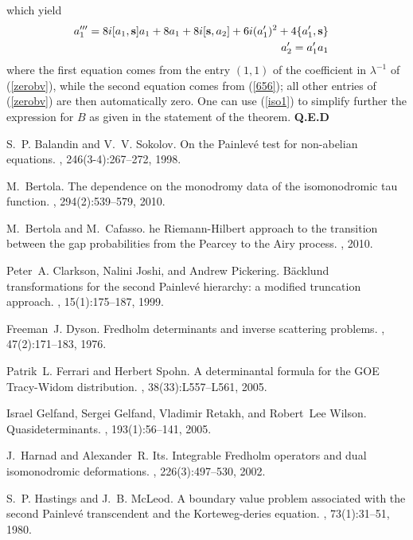 \documentclass{article}
\def\ss{\mathbf s}
\def\&{&\hspace{-20pt}}
\def\QED{ {\bf Q.E.D}\par \vskip 4pt}
\newcommand{\be}{\begin{eqnarray}}
\newcommand{\ee}{\end{eqnarray}}
\begin{document}
which yield
\be
&\& a_1''' =  8i [a_1,\ss]a_1 + 8a_1 + 8i[\ss,a_2] + 6i (a_1')^2 + 4 \{a_1',\ss\} \label{iso1} \\
&\& a_2' = a_1' a_1\label{iso2}
\ee
where the first equation comes from the entry $(1,1)$ of the coefficient in $\lambda^{-1}$ of (\ref{zerobv}), while the  second equation comes from (\ref{656}); all other entries of (\ref{zerobv}) are then automatically zero.
One can use (\ref{iso1}) to simplify further the expression for $B$ as given in the statement of the theorem.
\QED
%
%
%
\def\cprime{$'$}
\begin{thebibliography}{10}

S.~P. Balandin and V.~V. Sokolov.
\newblock On the {P}ainlev{\'e} test for non-abelian equations.
, 246(3-4):267--272, 1998.

M.~Bertola.
\newblock The dependence on the monodromy data of the isomonodromic tau
  function.
, 294(2):539--579, 2010.

M.~Bertola and M.~Cafasso.
he {R}iemann-{H}ilbert approach to the transition between the gap
  probabilities from the {P}earcey to the {A}iry process.
, 2010.

Peter~A. Clarkson, Nalini Joshi, and Andrew Pickering.
\newblock B{\"a}cklund transformations for the second {P}ainlev{\'e} hierarchy:
  a modified truncation approach.
, 15(1):175--187, 1999.

Freeman~J. Dyson.
\newblock Fredholm determinants and inverse scattering problems.
, 47(2):171--183, 1976.

Patrik~L. Ferrari and Herbert Spohn.
\newblock A determinantal formula for the {GOE} {T}racy-{W}idom distribution.
, 38(33):L557--L561, 2005.

Israel Gelfand, Sergei Gelfand, Vladimir Retakh, and Robert~Lee Wilson.
\newblock Quasideterminants.
, 193(1):56--141, 2005.

J.~Harnad and Alexander~R. Its.
\newblock Integrable {F}redholm operators and dual isomonodromic deformations.
, 226(3):497--530, 2002.

S.~P. Hastings and J.~B. McLeod.
\newblock A boundary value problem associated with the second {P}ainlev{\'e}
  transcendent and the {K}orteweg-deries equation.
, 73(1):31--51, 1980.


\end{thebibliography}
\end{document}
